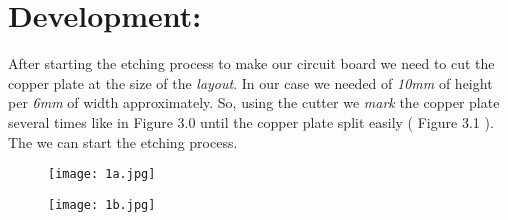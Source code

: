 \section{Development:}

After starting the etching process to make our circuit board we need to cut the copper plate at the size of the {\itshape layout}. In our case we needed of {\itshape 10mm} of height per {\itshape  6mm} of width approximately. So, using the cutter we {\itshape mark} the copper plate several times like in Figure 3.0 until the copper plate split easily ( Figure 3.1 ). The we can start the etching process. \hfill \break

\begin{figure}[H]
\texttt{[image: 1a.jpg]}
\centering \linebreak {}
\end{figure} \hfill \break

\begin{figure}[H]
\texttt{[image: 1b.jpg]}
\centering \linebreak {}
\end{figure}

\pagebreak